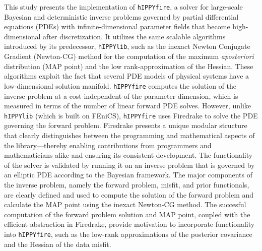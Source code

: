 This study presents the implementation of \texttt{hIPPYfire}, a solver for large-scale Bayesian and deterministic inverse problems governed by partial differential equations (PDEs) with infinite-dimensional parameter fields that become high-dimensional after discretization. It utilizes the same scalable algorithms introduced by its predecessor, \texttt{hIPPYlib}, such as the inexact Newton Conjugate Gradient (Newton-CG) method for the computation of the maximum \textit{aposteriori} distribution (MAP point) and the low rank-approximation of the Hessian. These algorithms exploit the fact that several PDE models of physical systems have a low-dimensional solution manifold. \texttt{hIPPYfire} computes the solution of the inverse problem at a cost independent of the parameter dimension, which is measured in terms of the number of linear forward PDE solves. However, unlike \texttt{hIPPYlib} (which is built on FEniCS), \texttt{hIPPYfire} uses Firedrake to solve the PDE governing the forward problem. Firedrake presents a unique modular structure that clearly distinguishes between the programming and mathematical aspects of the library---thereby enabling contributions from programmers and mathematicians alike and ensuring its consistent development. The functionality of the solver is validated by running it on an inverse problem that is governed by an elliptic PDE according to the Bayesian framework. The major components of the inverse problem, namely the forward problem, misfit, and prior functionals, are clearly defined and used to compute the solution of the forward problem and calculate the MAP point using the inexact Newton-CG method. The succesful computation of the forward problem solution and MAP point, coupled with the efficient abstraction in Firedrake, provide motivation to incorporate functionality into \texttt{hIPPYfire}, such as the low-rank approximations of the posterior covariance and the Hessian of the data misfit.
